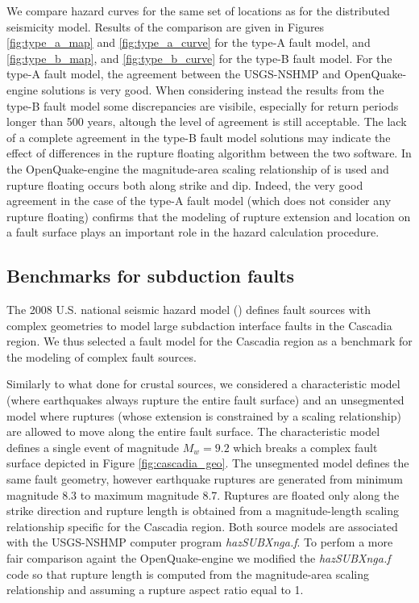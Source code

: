 We compare hazard curves for the same set of locations as for the distributed seismicity model. Results of the comparison are given in Figures \ref{fig:type_a_map} and \ref{fig:type_a_curve} for the type-A fault model, and \ref{fig:type_b_map}, and \ref{fig:type_b_curve} for the type-B fault model. For the type-A fault model, the agreement between the USGS-NSHMP and OpenQuake-engine solutions is very good. When considering instead the results from the type-B fault model some discrepancies are visibile, especially for return periods longer than 500 years, altough the level of agreement is still acceptable. The lack of a complete agreement in the type-B fault model solutions may indicate the effect of differences in the rupture floating algorithm between the two software. In the OpenQuake-engine the magnitude-area scaling relationship of \citet{wells1994} is used and rupture floating occurs both along strike and dip. Indeed, the very good agreement in the case of the type-A fault model (which does not consider any rupture floating) confirms that the modeling of rupture extension and location on a fault surface plays an important role in the hazard calculation procedure.

\subsection{Benchmarks for subduction faults}
The 2008 U.S. national seismic hazard model (\cite{petersen2008}) defines fault sources with complex geometries to model large subdaction interface faults in the Cascadia region. We thus selected a fault model for the Cascadia region as a benchmark for the modeling of complex fault sources.

Similarly to what done for crustal sources, we considered a characteristic model (where earthquakes always rupture the entire fault surface) and an unsegmented model where ruptures (whose extension is constrained by a scaling relationship) are allowed to move along the entire fault surface. The characteristic model defines a single event of magnitude $M_{w}=9.2$ which breaks a complex fault surface depicted in Figure \ref{fig:cascadia_geo}. The unsegmented model defines the same fault geometry, however earthquake ruptures are generated from minimum magnitude 8.3 to maximum magnitude 8.7. Ruptures are floated only along the strike direction and rupture length is obtained from a magnitude-length scaling relationship specific for the Cascadia region. Both source models are associated with the USGS-NSHMP computer program \textit{hazSUBXnga.f}. To perfom a more fair comparison againt the OpenQuake-engine we modified the \textit{hazSUBXnga.f} code so that rupture length is computed from the \citet{wells1994} magnitude-area scaling relationship and assuming a rupture aspect ratio equal to 1.

